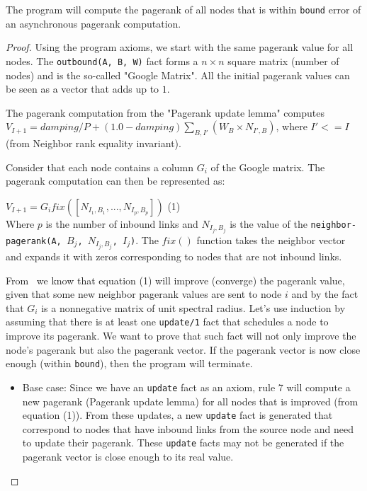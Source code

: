 \begin{theorem}
The program will compute the pagerank of all nodes that is within \texttt{bound} error
of an asynchronous pagerank computation.
\end{theorem}
\begin{proof}

Using the program axioms, we start with the same pagerank value for all nodes.
The \texttt{\bang outbound(A, B, W)} fact forms a $n \times n$ square matrix (number
of nodes) and is the so-called "Google Matrix".  All the initial pagerank values
can be seen as a vector that adds up to $1$.

The pagerank computation from the "Pagerank update lemma" computes $V_{I + 1} =
damping / P + (1.0 - damping)\sum_{B, I'} (W_{B} \times N_{I',B})$, where $I' <=
I$
(from Neighbor rank equality invariant).

Consider that each node contains a column $G_i$ of the Google matrix. The
pagerank computation can then be represented as: \newline


$V_{I + 1} = G_i fix([N_{I_1, B_1}, ..., N_{I_p, B_p}])$ \hfill (1) \\


Where $p$ is the number of inbound links and $N_{I_j, B_j}$ is the value of
the \texttt{neighbor-pagerank(A, $B_j$, $N_{I_j, B_j}$, $I_j$)}. The $fix()$
function takes the neighbor vector and expands it with zeros corresponding to
nodes that are not inbound links.

From~\cite{DBLP:journals/corr/abs-cs-0606047, Lubachevsky:1986:CAA:4904.4801} we
know that equation (1) will improve (converge) the pagerank value, given that some new
neighbor pagerank values are sent to node $i$ and by the fact that $G_i$ is a
nonnegative matrix of unit spectral radius. Let's use induction by assuming that there
is at least one \texttt{update/1} fact that
schedules a node to improve its pagerank. We want to prove that such fact will
not only improve the node's pagerank but also the pagerank vector.
If the pagerank vector is now close enough (within \texttt{bound}), then the
program will terminate.

\begin{itemize}
   \item Base case: Since we have an \texttt{update} fact as an axiom, rule 7
   will compute a new pagerank (Pagerank update lemma) for all nodes that is
   improved (from equation (1)). From these updates, a new \texttt{update}
   fact is generated that correspond to nodes that have inbound links from the
   source node and need to update their pagerank. These \texttt{update} facts
   may not be generated if the pagerank vector is close enough to its real
   value.


\end{itemize}
\end{proof}
